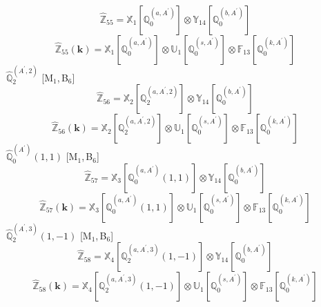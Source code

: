 \documentclass[fleqn,10pt,landscape]{article}
\begin{document}
\begin{itemize}
\begin{dmath*}
\hat{\mathbb{Z}}_{55}=\mathbb{X}_{1}[\mathbb{Q}_{0}^{(a,A^{\prime})}] \otimes\mathbb{Y}_{14}[\mathbb{Q}_{0}^{(b,A^{\prime})}]
\end{dmath*}
\begin{dmath*}
\hat{\mathbb{Z}}_{55}(\bm{k})=\mathbb{X}_{1}[\mathbb{Q}_{0}^{(a,A^{\prime})}] \otimes\mathbb{U}_{1}[\mathbb{Q}_{0}^{(s,A^{\prime})}] \otimes\mathbb{F}_{13}[\mathbb{Q}_{0}^{(k,A^{\prime})}]
\end{dmath*}
\vspace{4mm}
\noindent {} $\,\,\,\hat{\mathbb{Q}}_{2}^{(A^{\prime},2)}$ [M$_{1}$,\,B$_{6}$]
\begin{dmath*}
\hat{\mathbb{Z}}_{56}=\mathbb{X}_{2}[\mathbb{Q}_{2}^{(a,A^{\prime},2)}] \otimes\mathbb{Y}_{14}[\mathbb{Q}_{0}^{(b,A^{\prime})}]
\end{dmath*}
\begin{dmath*}
\hat{\mathbb{Z}}_{56}(\bm{k})=\mathbb{X}_{2}[\mathbb{Q}_{2}^{(a,A^{\prime},2)}] \otimes\mathbb{U}_{1}[\mathbb{Q}_{0}^{(s,A^{\prime})}] \otimes\mathbb{F}_{13}[\mathbb{Q}_{0}^{(k,A^{\prime})}]
\end{dmath*}
\vspace{4mm}
\noindent {} $\,\,\,\hat{\mathbb{Q}}_{0}^{(A^{\prime})}(1,1)$ [M$_{1}$,\,B$_{6}$]
\begin{dmath*}
\hat{\mathbb{Z}}_{57}=\mathbb{X}_{3}[\mathbb{Q}_{0}^{(a,A^{\prime})}(1,1)] \otimes\mathbb{Y}_{14}[\mathbb{Q}_{0}^{(b,A^{\prime})}]
\end{dmath*}
\begin{dmath*}
\hat{\mathbb{Z}}_{57}(\bm{k})=\mathbb{X}_{3}[\mathbb{Q}_{0}^{(a,A^{\prime})}(1,1)] \otimes\mathbb{U}_{1}[\mathbb{Q}_{0}^{(s,A^{\prime})}] \otimes\mathbb{F}_{13}[\mathbb{Q}_{0}^{(k,A^{\prime})}]
\end{dmath*}
\vspace{4mm}
\noindent {} $\,\,\,\hat{\mathbb{Q}}_{2}^{(A^{\prime},3)}(1,-1)$ [M$_{1}$,\,B$_{6}$]
\begin{dmath*}
\hat{\mathbb{Z}}_{58}=\mathbb{X}_{4}[\mathbb{Q}_{2}^{(a,A^{\prime},3)}(1,-1)] \otimes\mathbb{Y}_{14}[\mathbb{Q}_{0}^{(b,A^{\prime})}]
\end{dmath*}
\begin{dmath*}
\hat{\mathbb{Z}}_{58}(\bm{k})=\mathbb{X}_{4}[\mathbb{Q}_{2}^{(a,A^{\prime},3)}(1,-1)] \otimes\mathbb{U}_{1}[\mathbb{Q}_{0}^{(s,A^{\prime})}] \otimes\mathbb{F}_{13}[\mathbb{Q}_{0}^{(k,A^{\prime})}]
\end{dmath*}
\vspace{4mm}

\end{itemize}
\end{document}
